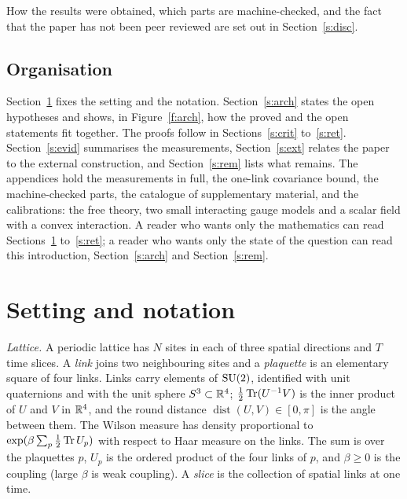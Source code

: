 How the results were obtained, which parts are machine-checked, and the fact that the paper has not been
peer reviewed are set out in Section~\ref{s:disc}.

\subsection{Organisation}
Section~\ref{s:set} fixes the setting and the notation. Section~\ref{s:arch} states the open hypotheses and
shows, in Figure~\ref{f:arch}, how the proved and the open statements fit together. The proofs follow in
Sections~\ref{s:crit} to~\ref{s:ret}. Section~\ref{s:evid} summarises the measurements, Section~\ref{s:ext}
relates the paper to the external construction, and Section~\ref{s:rem} lists what remains. The appendices
hold the measurements in full, the one-link covariance bound, the machine-checked parts, the catalogue of
supplementary material, and the calibrations: the free theory, two small interacting gauge models and a
scalar field with a convex interaction. A reader who wants only the mathematics can read Sections~\ref{s:set}
to~\ref{s:ret}; a reader who wants only the state of the question can read this introduction,
Section~\ref{s:arch} and Section~\ref{s:rem}.

\section{Setting and notation}\label{s:set}
\emph{Lattice.} A periodic lattice has $N$ sites in each of three spatial directions and $T$ time slices.
A \emph{link} joins two neighbouring sites and a \emph{plaquette} is an elementary square of four links.
Links carry elements of $\mathrm{SU}(2)$, identified with unit quaternions and with the unit sphere $S^3\subset\mathbb{R}^4$;
$\tfrac12\operatorname{Tr}(U^{-1}V)$ is the inner product of $U$ and $V$ in $\mathbb{R}^4$, and the round distance
$\operatorname{dist}(U,V)\in[0,\pi]$ is the angle between them. The Wilson measure has density proportional
to $\exp(\beta\sum_p\tfrac12\operatorname{Tr} U_p)$ with respect to Haar measure on the links. The sum is over the
plaquettes $p$, $U_p$ is the ordered product of the four links of $p$, and $\beta\ge0$ is the coupling
(large $\beta$ is weak coupling). A \emph{slice} is the collection of spatial links at one time.


